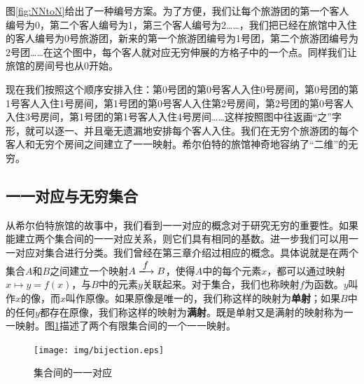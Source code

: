 \documentclass{article}
\begin{document}
图\ref{fig:NNtoN}给出了一种编号方案。为了方便，我们让每个旅游团的第一个客人编号为0，第二个客人编号为1，第三个客人编号为2……，我们把已经在旅馆中入住的客人编号为0号旅游团，新来的第一个旅游团编号为1号团，第二个旅游团编号为2号团……在这个图中，每个客人就对应无穷伸展的方格子中的一个点。同样我们让旅馆的房间号也从0开始。

现在我们按照这个顺序安排入住：第0号团的第0号客人入住0号房间，第0号团的第1号客人入住1号房间，第1号团的第0号客人入住第2号房间，第2号团的第0号客人入住3号房间，第1号团的第1号客人入住4号房间……这样按照图中往返画“之”字形，就可以逐一、并且毫无遗漏地安排每个客人入住。我们在无穷个旅游团的每个客人和无穷个房间之间建立了一一映射。希尔伯特的旅馆神奇地容纳了“二维”的无穷。

\begin{Exercise}
\end{Exercise}

\subsection{一一对应与无穷集合}

从希尔伯特旅馆的故事中，我们看到一一对应的概念对于研究无穷的重要性。如果能建立两个集合间的一一对应关系，则它们具有相同的基数。进一步我们可以用一一对应对集合进行分类。我们曾经在第三章介绍过相应的概念。具体说就是在两个集合$A$和$B$之间建立一个映射$A \arrowto{f} B$，使得$A$中的每个元素$x$，都可以通过映射$x \mapsto y = f(x)$，与$B$中的元素$y$关联起来。对于集合，我们也称映射$f$为函数。$y$叫作$x$的像，而$x$叫作原像。如果原像是唯一的，我们称这样的映射为\textbf{单射}；如果$B$中的任何$y$都存在原像，我们称这样的映射为\textbf{满射}。既是单射又是满射的映射称为一一映射。图\ref{fig:bijection}描述了两个有限集合间的一个一一映射。

\begin{figure}[htbp]
 \centering
 \texttt{[image: img/bijection.eps]}
 \caption{集合间的一一对应}
 \label{fig:bijection}
\end{figure}
\end{document}
